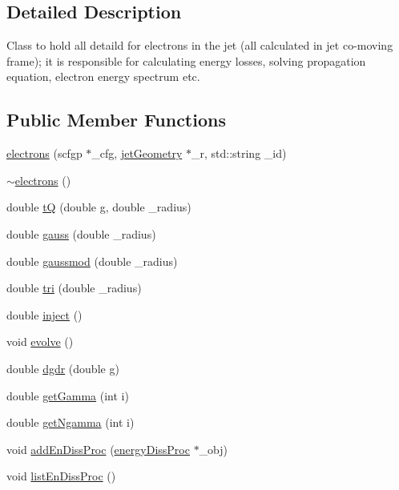 \subsection{Detailed Description}
Class to hold all detaild for electrons in the jet (all calculated in jet co-\/moving frame); it is responsible for calculating energy losses, solving propagation equation, electron energy spectrum etc. \subsection*{Public Member Functions}
\begin{DoxyCompactItemize}
\item 
\hyperlink{classelectrons_a5532b5fbcb8b735e50116227aa8f2ebc}{electrons} (scfgp $\ast$\-\_\-cfg, \hyperlink{classjetGeometry}{jet\-Geometry} $\ast$\-\_\-r, std\-::string \-\_\-id)
\item 
\hyperlink{classelectrons_a146d787f88697a2ca2acaa245055d63b}{$\sim$electrons} ()
\item 
double \hyperlink{classelectrons_aefdd16f24a2f35cef7f5d01930da00ee}{t\-Q} (double g, double \-\_\-radius)
\item 
double \hyperlink{classelectrons_aa47f9474892a92a011f952731bf1cdeb}{gauss} (double \-\_\-radius)
\item 
double \hyperlink{classelectrons_aa9fa0208f23e0a28f50652606a7f7481}{gaussmod} (double \-\_\-radius)
\item 
double \hyperlink{classelectrons_a75b123e6b9d2ff587bee4a4be4fa3bbe}{tri} (double \-\_\-radius)
\item 
double \hyperlink{classelectrons_ae87edc2ea2e2ce2050fa554da90f2852}{inject} ()
\item 
void \hyperlink{classelectrons_a4e45b3bf040e39dad560d3b7e6572c90}{evolve} ()
\item 
double \hyperlink{classelectrons_afe0e0014e58c500a9bcf62357f781263}{dgdr} (double g)
\item 
double \hyperlink{classelectrons_afb0d9365f13787f44d23fb489732fc90}{get\-Gamma} (int i)
\item 
double \hyperlink{classelectrons_a24fbbed0acac968ce6b2ef2c5043dee4}{get\-Ngamma} (int i)
\item 
void \hyperlink{classelectrons_a41db9252c408dd206342f0d23c8edb96}{add\-En\-Diss\-Proc} (\hyperlink{classenergyDissProc}{energy\-Diss\-Proc} $\ast$\-\_\-obj)
\item 
void \hyperlink{classelectrons_a771ec6a114df4f41d09273f1c57db07d}{list\-En\-Diss\-Proc} ()
\item 

\end{DoxyCompactItemize}
